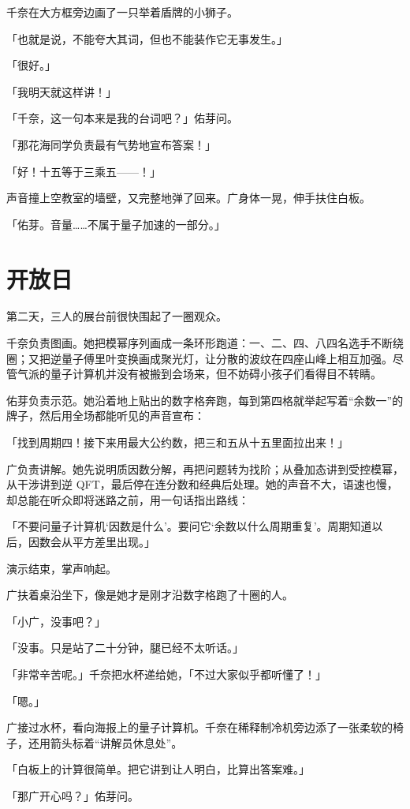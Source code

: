 千奈在大方框旁边画了一只举着盾牌的小狮子。

「也就是说，不能夸大其词，但也不能装作它无事发生。」

「很好。」

「我明天就这样讲！」

「千奈，这一句本来是我的台词吧？」佑芽问。

「那花海同学负责最有气势地宣布答案！」

「好！十五等于三乘五——！」

声音撞上空教室的墙壁，又完整地弹了回来。广身体一晃，伸手扶住白板。

「佑芽。音量……不属于量子加速的一部分。」

\section{开放日}

第二天，三人的展台前很快围起了一圈观众。

千奈负责图画。她把模幂序列画成一条环形跑道：一、二、四、八四名选手不断绕圈；又把逆量子傅里叶变换画成聚光灯，让分散的波纹在四座山峰上相互加强。尽管气派的量子计算机并没有被搬到会场来，但不妨碍小孩子们看得目不转睛。

佑芽负责示范。她沿着地上贴出的数字格奔跑，每到第四格就举起写着“余数一”的牌子，然后用全场都能听见的声音宣布：

「找到周期四！接下来用最大公约数，把三和五从十五里面拉出来！」

广负责讲解。她先说明质因数分解，再把问题转为找阶；从叠加态讲到受控模幂，从干涉讲到逆 QFT，最后停在连分数和经典后处理。她的声音不大，语速也慢，却总能在听众即将迷路之前，用一句话指出路线：

「不要问量子计算机‘因数是什么’。要问它‘余数以什么周期重复’。周期知道以后，因数会从平方差里出现。」

演示结束，掌声响起。

广扶着桌沿坐下，像是她才是刚才沿数字格跑了十圈的人。

「小广，没事吧？」

「没事。只是站了二十分钟，腿已经不太听话。」

「非常辛苦呢。」千奈把水杯递给她，「不过大家似乎都听懂了！」

「嗯。」

广接过水杯，看向海报上的量子计算机。千奈在稀释制冷机旁边添了一张柔软的椅子，还用箭头标着“讲解员休息处”。

「白板上的计算很简单。把它讲到让人明白，比算出答案难。」

「那广开心吗？」佑芽问。

